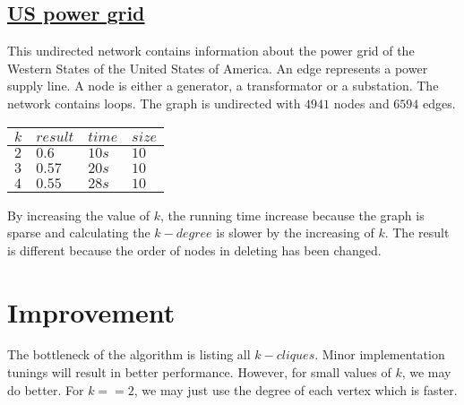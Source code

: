 \documentclass{article}
\begin{document}
\subsection{\href{http://konect.uni-koblenz.de/networks/opsahl-powergrid}{US power grid}}
This undirected network contains information about the power grid of the Western States of the United States of America. An edge represents a power supply line. A node is either a generator, a transformator or a substation. The network contains loops. The graph is undirected with $4941$ nodes and $6594$ edges. 
\begin{center}
	\begin{tabular}{ | m{1cm} | m{1cm}| m{2cm} | m{1cm} | } 
		\hline
		$k$ & $result$ & $time$ & $size$\\ 
		\hline
		$2$ & $0.6$ & $10s$  & $10$\\ 
		\hline
		$3$ & $0.57$ & $20s$  & $10$\\	 
		\hline
		$4$ & $0.55$ & $28s$  & $10$\\
		\hline
	\end{tabular}
\end{center}
By increasing the value of $k$, the running time increase because the graph is sparse and calculating the $k-degree$ is slower by the increasing of $k$. The result is different because the order of nodes in deleting has been changed.


\section{Improvement}
The bottleneck of the algorithm is listing all $k-cliques$. Minor implementation tunings will result in better performance. However, for small values of $k$, we may do better. For $k == 2$, we may just use the degree of each vertex which is faster. 
\end{document}
